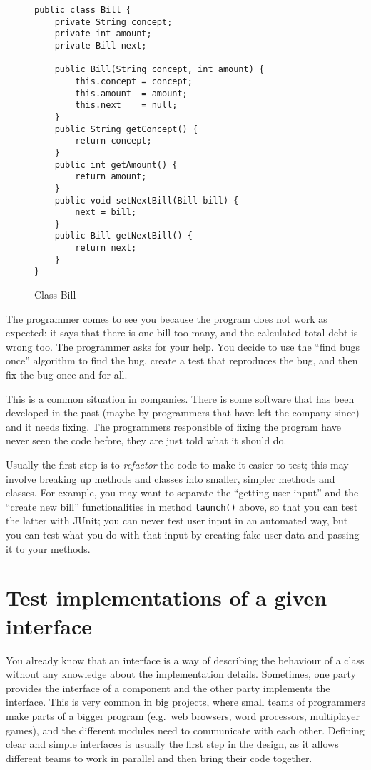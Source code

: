 \documentclass{article}
\begin{document}
\begin{figure}[hbtp]
  \centering
\begin{verbatim}
public class Bill {
    private String concept;
    private int amount;
    private Bill next;

    public Bill(String concept, int amount) {
        this.concept = concept;
        this.amount  = amount;
        this.next    = null;
    }
    public String getConcept() {
        return concept;
    }
    public int getAmount() {
        return amount;
    }
    public void setNextBill(Bill bill) {
        next = bill;
    }
    public Bill getNextBill() {
        return next;
    }
}
\end{verbatim}
  \caption{Class Bill}
  \label{fig:accountingggggtr}
\end{figure}

The programmer comes to see you because the program does not work as
expected: it says that there is one bill too many, and the calculated
total debt is wrong too. The programmer asks for
your help. You decide to use the ``find bugs once'' algorithm to find
the bug, create a test that reproduces the bug,
and then fix the bug once and for all. 

This is a common situation in companies. There is some software that
has been developed in the past (maybe by programmers that have left
the company since) and it needs fixing. The programmers responsible of
fixing the program have never seen the code before, they are just told
what it should do. 

Usually the first step is to \emph{refactor} the code to make it
easier to test; this may involve breaking up methods and classes into
smaller, simpler methods and classes. For example, you may want to
separate the ``getting user input'' and the ``create new bill''
functionalities in method \verb+launch()+ above, so that you can
test the latter with JUnit; you can never test user input in an
automated way, but you can test what you do with that input by
creating fake user data and passing it to your methods. 


\section{Test implementations of a given interface}
\label{sec:test-impl-given}

You already know that an interface is a way of describing the
behaviour of a class without any knowledge about the implementation 
details. Sometimes, one
party provides the interface of a component and the other party
implements the interface. This is very common in big projects, where
small teams of programmers make parts of a bigger program (e.g.~web
browsers, word processors, multiplayer games), and the different
modules need to communicate with each other. Defining clear and simple
interfaces is usually the first step in the design, as it allows
different teams to work in parallel and then bring their code
together. 
\end{document}
